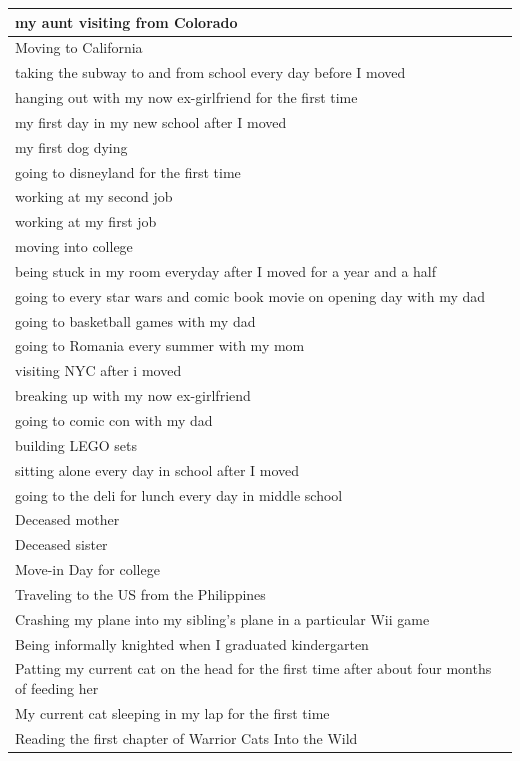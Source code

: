 \documentclass[
  .7em,
  letterpaper,
  DIV=11,
  numbers=noendperiod]{scrartcl}
\begin{document}
\begin{table}
\begin{tabular}{l}
\hline
my aunt visiting from Colorado\\
\hline
Moving to California\\
\hline
taking the subway to and from school every day before I moved\\
\hline
hanging out with my now ex-girlfriend for the first time\\
\hline
my first day in my new school after I moved\\
\hline
my first dog dying\\
\hline
going to disneyland for the first time\\
\hline
working at my second job\\
\hline
working at my first job\\
\hline
moving into college\\
\hline
being stuck in my room everyday after I moved for a year and a half\\
\hline
going to every star wars and comic book movie on opening day with my dad\\
\hline
going to basketball games with my dad\\
\hline
going to Romania every summer with my mom\\
\hline
visiting NYC after i moved\\
\hline
breaking up with my now ex-girlfriend\\
\hline
going to comic con with my dad\\
\hline
building LEGO sets\\
\hline
sitting alone every day in school after I moved\\
\hline
going to the deli for lunch every day in middle school\\
\hline
Deceased mother\\
\hline
Deceased sister\\
\hline
Move-in Day for college\\
\hline
Traveling to the US from the Philippines\\
\hline
Crashing my plane into my sibling's plane in a particular Wii game\\
\hline
Being informally knighted when I graduated kindergarten\\
\hline
Patting my current cat on the head for the first time after about four months of feeding her\\
\hline
My current cat sleeping in my lap for the first time\\
\hline
Reading the first chapter of Warrior Cats Into the Wild\\

\end{tabular}
\end{table}
\end{document}
